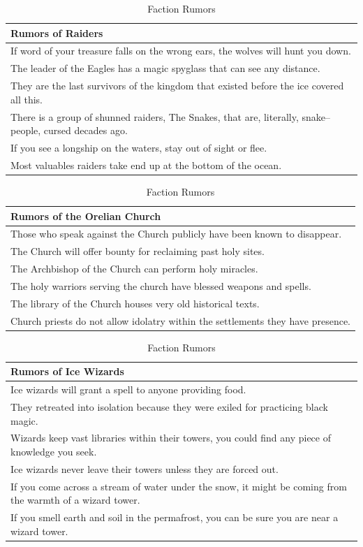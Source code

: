 \documentclass[notitlepage]{article}
\begin{document}
\begin{multicols}{2}
\begin{table}[t]
  \centering
  \begin{tabular}{|p{}|}
    \hline Rumors of Raiders \\ \hline \hline
    If word of your treasure falls on the wrong ears, the wolves will hunt you down. \\ \hline
    The leader of the Eagles has a magic spyglass that can see any distance. \\ \hline
    They are the last survivors of the kingdom that existed before the ice covered all this. \\ \hline
    There is a group of shunned raiders, The Snakes, that are, literally, snake--people, cursed decades ago. \\ \hline
    If you see a longship on the waters, stay out of sight or flee. \\ \hline
    Most valuables raiders take end up at the bottom of the ocean. \\ \hline
  \end{tabular} \begin{tabular}{|p{}|}
                  \hline Rumors of the Orelian Church \\ \hline \hline
                  Those who speak against the Church publicly have been known to disappear. \\ \hline
                  The Church will offer bounty for reclaiming past holy sites. \\ \hline
                  The Archbishop of the Church can perform holy miracles. \\ \hline
                  The holy warriors serving the church have blessed weapons and spells. \\ \hline
                  The library of the Church houses very old historical texts. \\ \hline
                  Church priests do not allow idolatry within the settlements they have presence. \\ \hline
  \end{tabular} \begin{tabular}{|p{}|}
    \hline Rumors of Ice Wizards \\ \hline \hline
    Ice wizards will grant a spell to anyone providing food. \\ \hline
    They retreated into isolation because they were exiled for practicing black magic. \\ \hline
    Wizards keep vast libraries within their towers, you could find any piece of knowledge you seek. \\ \hline
    Ice wizards never leave their towers unless they are forced out. \\ \hline
    If you come across a stream of water under the snow, it might be coming from the warmth of a wizard tower. \\ \hline
    If you smell earth and soil in the permafrost, you can be sure you are near a wizard tower. \\ \hline
   \end{tabular}
   \caption{Faction Rumors}
  \label{tab:rumors}
\end{table}



\end{multicols}
\end{document}
